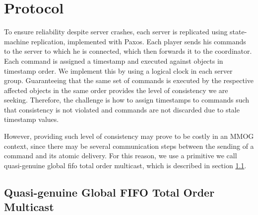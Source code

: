 \documentclass[times, 10pt]{article}
\begin{document}
% 
%
%



\section{Protocol}

To ensure reliability despite server crashes, each server is replicated using state-machine replication, implemented with Paxos. Each player sends his commands to the server to which he is connected, which then forwards it to the coordinator. Each command is assigned a timestamp and executed against objects in timestamp order. We implement this by using a logical clock in each server group. Guaranteeing that the same set of commands is executed by the respective affected objects in the same order provides the level of consistency we are seeking. Therefore, the challenge is how to assign timestamps to commands such that consistency is not violated and commands are not discarded due to stale timestamp values.

However, providing such level of consistency may prove to be costly in an MMOG context, since there may be several communication steps between the sending of a command and its atomic delivery. For this reason, we use a primitive we call quasi-genuine global fifo total order multicast, which is described in section \ref{sec:quasi}.

\subsection{Quasi-genuine Global FIFO Total Order Multicast}
\label{sec:quasi}
\end{document}
